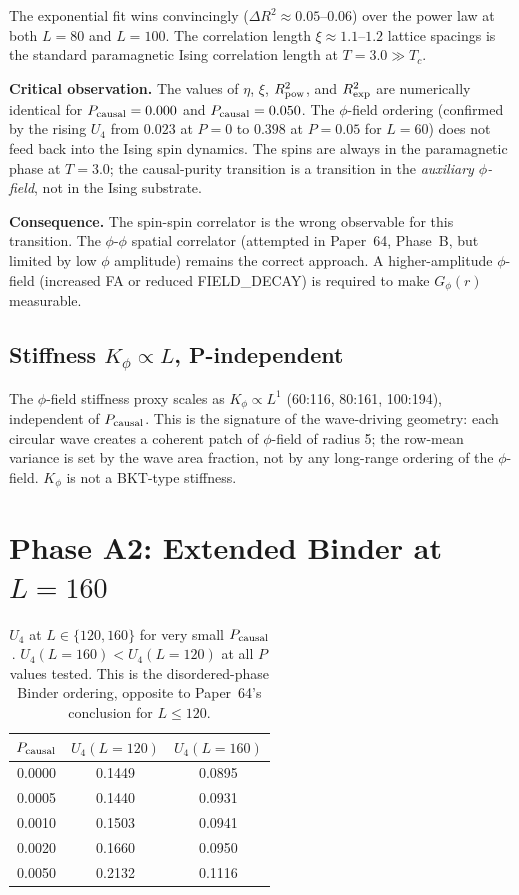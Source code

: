 \documentclass[12pt,a4paper]{article}
\begin{document}
The exponential fit wins convincingly ($\Delta R^2 \approx 0.05$--$0.06$)
over the power law at both $L=80$ and $L=100$.
The correlation length $\xi \approx 1.1$--$1.2$ lattice spacings
is the standard paramagnetic Ising correlation length at $T = 3.0 \gg T_c$.

\textbf{Critical observation.}
The values of $\eta$, $\xi$, $R^2_{\rm pow}$, and $R^2_{\rm exp}$
are numerically identical for $P_{\rm causal} = 0.000$ and $P_{\rm causal} = 0.050$.
The $\phi$-field ordering (confirmed by the rising $U_4$
from $0.023$ at $P=0$ to $0.398$ at $P=0.05$ for $L=60$)
does not feed back into the Ising spin dynamics.
The spins are always in the paramagnetic phase at $T=3.0$;
the causal-purity transition is a transition in the \emph{auxiliary $\phi$-field},
not in the Ising substrate.

\textbf{Consequence.}
The spin-spin correlator is the wrong observable for this transition.
The $\phi$-$\phi$ spatial correlator (attempted in Paper~64, Phase~B,
but limited by low $\phi$ amplitude) remains the correct approach.
A higher-amplitude $\phi$-field (increased FA or reduced FIELD\_DECAY)
is required to make $G_\phi(r)$ measurable.

\subsection{Stiffness $K_\phi \propto L$, P-independent}

The $\phi$-field stiffness proxy scales as $K_\phi \propto L^1$
(60:116, 80:161, 100:194), independent of $P_{\rm causal}$.
This is the signature of the wave-driving geometry:
each circular wave creates a coherent patch of $\phi$-field of radius 5;
the row-mean variance is set by the wave area fraction, not by any
long-range ordering of the $\phi$-field.
$K_\phi$ is not a BKT-type stiffness.

\section{Phase A2: Extended Binder at $L=160$}

\begin{table}[h]
\centering
\caption{$U_4$ at $L \in \{120, 160\}$ for very small $P_{\rm causal}$.
$U_4(L=160) < U_4(L=120)$ at all $P$ values tested.
This is the disordered-phase Binder ordering, opposite to Paper~64's
conclusion for $L \leq 120$.}
\label{tab:u4_160}
\begin{tabular}{ccc}
\toprule
$P_{\rm causal}$ & $U_4(L=120)$ & $U_4(L=160)$ \\
\midrule
0.0000 & 0.1449 & 0.0895 \\
0.0005 & 0.1440 & 0.0931 \\
0.0010 & 0.1503 & 0.0941 \\
0.0020 & 0.1660 & 0.0950 \\
0.0050 & 0.2132 & 0.1116 \\
\bottomrule
\end{tabular}
\end{table}
\end{document}
